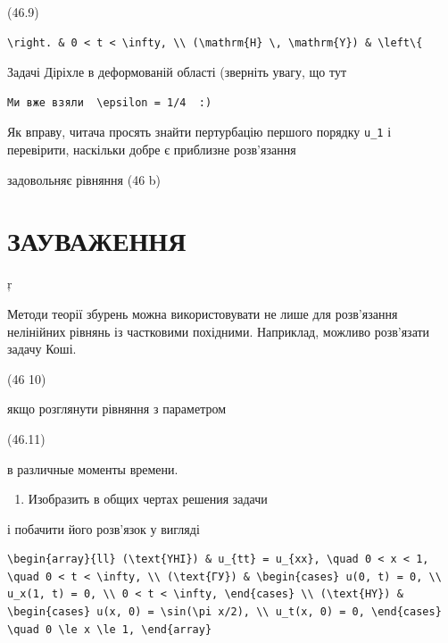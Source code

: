 \documentclass[
  ukrainian,
]{article}
\providecommand{\tightlist}{%
  \setlength{\itemsep}{0pt}\setlength{\parskip}{0pt}}
\begin{document}
(46.9)

\begin{verbatim}
\right. & 0 < t < \infty, \\ (\mathrm{H} \, \mathrm{Y}) & \left\{
\end{verbatim}

Задачі Діріхле в деформованій області (зверніть увагу, що тут

\begin{verbatim}
Ми вже взяли  \epsilon = 1/4  :)
\end{verbatim}

Як вправу, читача просять знайти пертурбацію першого порядку
\texttt{u\_1} і перевірити, наскільки добре є приблизне розв'язання

задовольняє рівняння (46 b)

\section{ЗАУВАЖЕННЯ}\label{ux437ux430ux443ux432ux430ux436ux435ux43dux43dux44f-4}

ŗ

Методи теорії збурень можна використовувати не лише для розв'язання
нелінійних рівнянь із частковими похідними. Наприклад, можливо
розв'язати задачу Коші.

(46 10)

якщо розглянути рівняння з параметром

(46.11)

в различные моменты времени.

\begin{enumerate}
\def\labelenumi{\arabic{enumi}.}
\setcounter{enumi}{1}
\tightlist
\item
  Изобразить в общих чертах решения задачи
\end{enumerate}

і побачити його розв'язок у вигляді

\begin{verbatim}
\begin{array}{ll} (\text{YHI}) & u_{tt} = u_{xx}, \quad 0 < x < 1, \quad 0 < t < \infty, \\ (\text{ГУ}) & \begin{cases} u(0, t) = 0, \\ u_x(1, t) = 0, \\ 0 < t < \infty, \end{cases} \\ (\text{HY}) & \begin{cases} u(x, 0) = \sin(\pi x/2), \\ u_t(x, 0) = 0, \end{cases} \quad 0 \le x \le 1, \end{array}
\end{verbatim}
\end{document}
